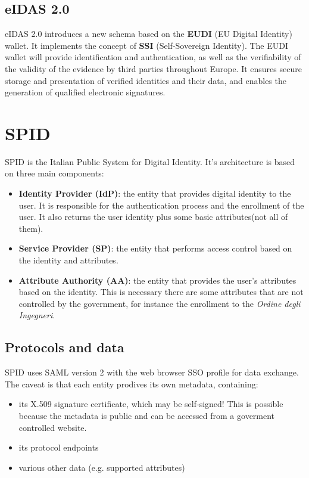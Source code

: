 \subsection{eIDAS 2.0}

eIDAS 2.0 introduces a new schema based on the \textbf{EUDI} (EU
Digital Identity) wallet. It implements the concept of \textbf{SSI}
(Self-Sovereign Identity). The EUDI wallet will provide identification
and authentication, as well as the verifiability of the validity of
the evidence by third parties throughout Europe. It ensures secure
storage and presentation of verified identities and their data, and
enables the generation of qualified electronic signatures.


\section{SPID}
SPID is the Italian Public System for Digital Identity. It's
architecture is based on three main components:
\begin{itemize}
  \item \textbf{Identity Provider (IdP)}: the entity that provides
    digital identity to the user. It is responsible for the
    authentication process and the enrollment of the user.
    It also returns the user identity plus some basic attributes(not
    all of them).
  \item \textbf{Service Provider (SP)}: the entity that performs
    access control based on the identity and attributes. 
  \item \textbf{Attribute Authority (AA)}: the entity that provides
    the user's attributes based on the identity. This is necessary
    there are some attributes that are not controlled by the
    government, for instance the enrollment to the \textit{Ordine
    degli Ingegneri}.
\end{itemize}

\subsection{Protocols and data}
SPID uses SAML version 2 with the web browser SSO profile for data
exchange. The caveat is that each entity prodives its own metadata,
containing:
\begin{itemize}
  \item its X.509 signature certificate, which may be self-signed!
    This is possible because the metadata is public and can be 
    accessed from a goverment controlled website.
  \item its protocol endpoints
  \item various other data (e.g. supported attributes)
\end{itemize}

